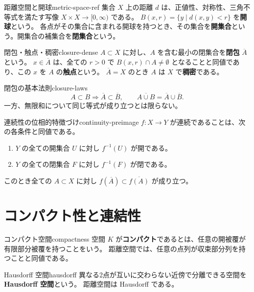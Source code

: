 \begin{definition}{距離空間と開球}{metric-space-ref}
集合 $X$ 上の距離 $d$ は、正値性、対称性、三角不等式を満たす写像 $X\times X\to[0,\infty)$ である。
$B(x,r)=\{y\mid d(x,y)<r\}$ を\textbf{開球}という。
各点がその集合に含まれる開球を持つとき、その集合を\textbf{開集合}という。開集合の補集合を\textbf{閉集合}という。
\end{definition}

\begin{definition}{閉包・触点・稠密}{closure-dense}
$A\subset X$ に対し、$A$ を含む最小の閉集合を\textbf{閉包} $\overline A$ という。
$x\in\overline A$ は、全ての $r>0$ で $B(x,r)\cap A\ne\emptyset$ となることと同値であり、この $x$ を $A$ の\textbf{触点}という。
$\overline A=X$ のとき $A$ は $X$ で\textbf{稠密}である。
\end{definition}

\begin{proposition}{閉包の基本法則}{closure-laws}
\[
 A\subset B\Longrightarrow\overline A\subset\overline B,
 \qquad \overline{A\cup B}=\overline A\cup\overline B.
\]
一方、無限和について同じ等式が成り立つとは限らない。
\end{proposition}

\begin{theorem}{連続性の位相的特徴づけ}{continuity-preimage}
$f:X\to Y$ が連続であることは、次の各条件と同値である。
\begin{enumerate}
  \item $Y$ の全ての開集合 $U$ に対し $f^{-1}(U)$ が開である。
  \item $Y$ の全ての閉集合 $F$ に対し $f^{-1}(F)$ が閉である。
\end{enumerate}
このとき全ての $A\subset X$ に対し
$f(\overline A)\subset\overline{f(A)}$ が成り立つ。
\end{theorem}

\section{コンパクト性と連結性}

\begin{definition}{コンパクト空間}{compactness}
空間 $K$ が\textbf{コンパクト}であるとは、任意の開被覆が有限部分被覆を持つことをいう。
距離空間では、任意の点列が収束部分列を持つことと同値である。
\end{definition}

\begin{definition}{Hausdorff 空間}{hausdorff}
異なる2点が互いに交わらない近傍で分離できる空間を\textbf{Hausdorff 空間}という。
距離空間は Hausdorff である。
\end{definition}

